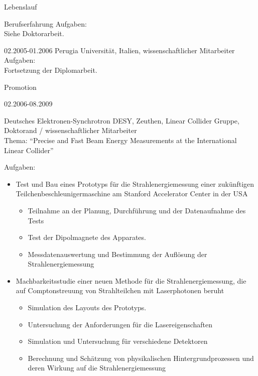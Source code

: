 \documentclass[11pt,a4paper]{scrartcl}
\begin{document}
\begin{cv}{Lebenslauf}
\begin{cvlist}{Berufserfahrung}
Aufgaben:\\

Siehe Doktorarbeit.

\vspace{\baselineskip}

\item[02.2005-01.2006] Perugia
Universit\"at, Italien, wissenschaftlicher Mitarbeiter \\

Aufgaben:\\

Fortsetzung der Diplomarbeit.

\end{cvlist}

\begin{cvlist}{Promotion}
\item[02.2006-08.2009]

Deutsches Elektronen-Synchrotron DESY, Zeuthen, Linear Collider
Gruppe, Doktorand / wissenschaftlicher Mitarbeiter\\ Thema:
"`Precise and Fast Beam Energy Measurements at the International
Linear Collider"'

Aufgaben:\\

\begin{itemize}
  
  \item Test und Bau eines Prototyps f{\"u}r die
  Strahlenergiemessung einer zuk{\"u}nftigen
  Teilchenbeschleunigermaschine am Stanford Accelerator Center in
  der USA
  \begin{itemize}
    \item Teilnahme an der Planung, Durchf{\"u}hrung und der
    Datenaufnahme des Tests
    \item Test der Dipolmagnete des Apparates.
    \item Messdatenauswertung und Bestimmung der Aufl{\"o}sung der
    Strahlenergiemessung
  \end{itemize}
  
  \item Machbarkeitsstudie einer neuen Methode f{\"u}r die
  Strahlenergiemessung, die auf Comptonstreuung von
  Strahlteilchen mit Laserphotonen beruht
  \begin{itemize}
    \item Simulation des Layouts des Prototyps.
    \item Untersuchung der Anforderungen f{\"u}r die
    Lasereigenschaften
    \item Simulation und Untersuchung f{\"u}r verschiedene
    Detektoren
    \item Berechnung und Sch{\"a}tzung von physikalischen
    Hintergrundprozessen und deren Wirkung auf die
    Strahlenergiemessung
  \end{itemize}
  

\end{itemize}
\end{cvlist}
\end{cv}
\end{document}
